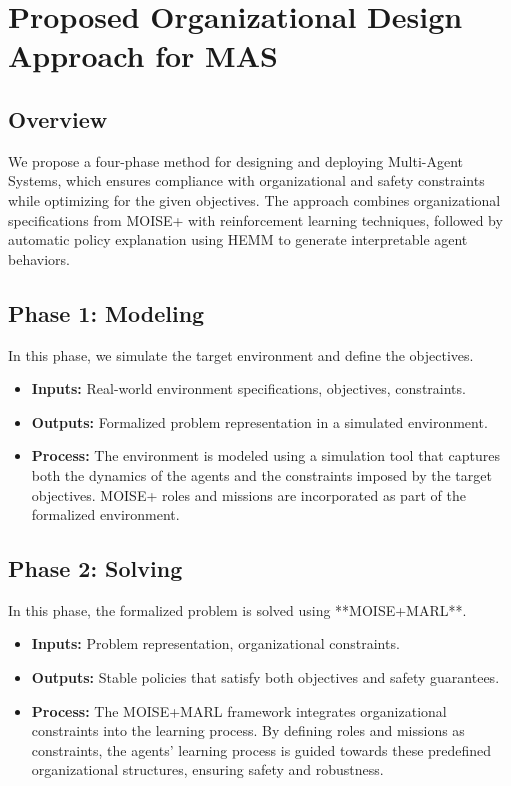 \documentclass[sigconf,anonymous]{aamas}
\begin{document}
\section{Proposed Organizational Design Approach for MAS}

\subsection{Overview}
We propose a four-phase method for designing and deploying Multi-Agent Systems, which ensures compliance with organizational and safety constraints while optimizing for the given objectives. The approach combines organizational specifications from MOISE+ with reinforcement learning techniques, followed by automatic policy explanation using HEMM to generate interpretable agent behaviors.

\subsection{Phase 1: Modeling}
In this phase, we simulate the target environment and define the objectives.
\begin{itemize}
    \item \textbf{Inputs:} Real-world environment specifications, objectives, constraints.
    \item \textbf{Outputs:} Formalized problem representation in a simulated environment.
    \item \textbf{Process:} The environment is modeled using a simulation tool that captures both the dynamics of the agents and the constraints imposed by the target objectives. MOISE+ roles and missions are incorporated as part of the formalized environment.
\end{itemize}

\subsection{Phase 2: Solving}
In this phase, the formalized problem is solved using **MOISE+MARL**.
\begin{itemize}
    \item \textbf{Inputs:} Problem representation, organizational constraints.
    \item \textbf{Outputs:} Stable policies that satisfy both objectives and safety guarantees.
    \item \textbf{Process:} The MOISE+MARL framework integrates organizational constraints into the learning process. By defining roles and missions as constraints, the agents’ learning process is guided towards these predefined organizational structures, ensuring safety and robustness.
\end{itemize}
\end{document}
